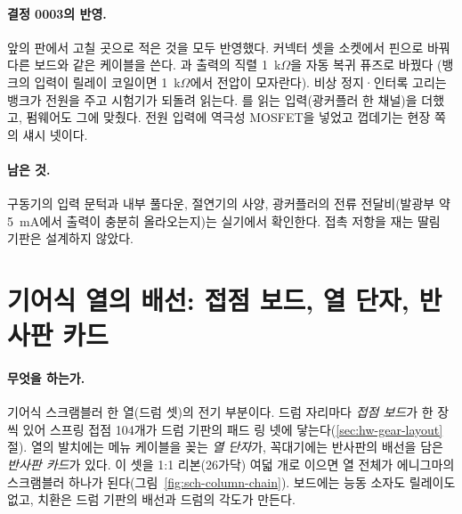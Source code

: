 \paragraph{결정 0003의 반영.} 앞의 판에서 고칠 곳으로 적은 것을 모두 반영했다. 커넥터 셋을 소켓에서 핀으로
바꿔 다른 보드와 같은 케이블을 쓴다. 과  출력의 직렬 1~k$\Omega$을 자동 복귀 퓨즈로 바꿨다
(뱅크의 입력이 릴레이 코일이면 1~k$\Omega$에서 전압이 모자란다). 비상 정지·인터록 고리는 뱅크가 전원을 주고
시험기가 되돌려 읽는다. 를 읽는 입력(광커플러 한 채널)을 더했고, 펌웨어도 그에 맞췄다. 전원
입력에 역극성 MOSFET을 넣었고 껍데기는 현장 쪽의 섀시 넷이다.

\paragraph{남은 것.} 구동기의 입력 문턱과 내부 풀다운, 절연기의 사양, 광커플러의 전류 전달비(발광부 약 5~mA에서
출력이 충분히 올라오는지)는 실기에서 확인한다. 접촉 저항을 재는 딸림 기판은 설계하지 않았다.


\section{기어식 열의 배선: 접점 보드, 열 단자, 반사판 카드}\label{sch:contact-board}

\paragraph{무엇을 하는가.} 기어식 스크램블러 한 열(드럼 셋)의 전기 부분이다. 드럼 자리마다 \emph{접점 보드}가 한
장씩 있어 스프링 접점 104개가 드럼 기판의 패드 링 넷에 닿는다(\ref{sec:hw-gear-layout}절). 열의 발치에는 메뉴
케이블을 꽂는 \emph{열 단자}가, 꼭대기에는 반사판의 배선을 담은 \emph{반사판 카드}가 있다. 이 셋을 1:1 리본(26가닥)
여덟 개로 이으면 열 전체가 에니그마의 스크램블러 하나가 된다(그림~\ref{fig:sch-column-chain}). 보드에는 능동 소자도
릴레이도 없고, 치환은 드럼 기판의 배선과 드럼의 각도가 만든다.

